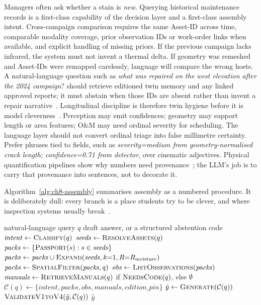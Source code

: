 Managers often ask whether a stain is \emph{new}. Querying historical maintenance records is a first-class capability of the decision layer and a first-class assembly intent. Cross-campaign comparison requires the same Asset-ID across time, comparable modality coverage, prior observation IDs or work-order links when available, and explicit handling of missing priors. If the previous campaign lacks infrared, the system must not invent a thermal delta. If geometry was remeshed and Asset-IDs were remapped carelessly, language will compare the wrong hosts. A natural-language question such as \emph{what was repaired on the west elevation after the 2024 campaign}? should retrieve editioned twin memory and any linked approved reports; it must abstain when those IDs are absent rather than invent a repair narrative~\cite{zhang2025,yang2025detreconreg,chen2023facility}. Longitudinal discipline is therefore twin hygiene before it is model cleverness~\cite{zhang2025,yang2025detreconreg,zhao2026physical}. Perception may emit confidences; geometry may support length or area features; O\&M may need ordinal severity for scheduling. The language layer should not convert ordinal triage into false millimetre certainty. Prefer phrases tied to fields, such as \emph{severity=medium from geometry-normalised crack length; confidence=0.71 from detector}, over cinematic adjectives. Physical quantification pipelines show why numbers need provenance~\cite{zhao2024facade,zhao2026physical}; the LLM's job is to carry that provenance into sentences, not to decorate it.

Algorithm~\ref{alg:ch8-assembly} summarises assembly as a numbered procedure. It is deliberately dull: every branch is a place students try to be clever, and where inspection systems usually break~\cite{lewis2020,peng2024,jeon2025hybridrag}.

\begin{algorithm}[htbp]
\caption{Intent-conditioned twin assembly for a grounded inspection answer.}
\label{alg:ch8-assembly}
\begin{algorithmic}[1]
\Require natural-language query $q$
\Ensure draft answer, or a structured abstention code
\State $\mathit{intent} \gets \textsc{Classify}(q)$
\State $\mathit{seeds} \gets \textsc{ResolveAssets}(q)$ 
\State $\mathit{packs} \gets \{\textsc{Passport}(s): s\in\mathit{seeds}\}$
 \State $\mathit{packs} \gets \mathit{packs}\cup\textsc{Expand}(\mathit{seeds},k{=}1,R{=}R_{\mathrm{moisture}})$
\EndIf
{}
 \State $\mathit{packs} \gets \textsc{SpatialFilter}(\mathit{packs},q)$
\EndIf
\State $\mathit{obs} \gets \textsc{ListObservations}(\mathit{packs})$
\State $\mathit{manuals} \gets \textsc{RetrieveManuals}(q)$ if $\textsc{NeedsCode}(q)$, else $\emptyset$
\State $\mathcal{C}(q) \gets \{\mathit{intent},\mathit{packs},\mathit{obs},\mathit{manuals},\mathit{edition\_pin}\}$
\State $\hat{y} \gets \textsc{Generate}(\mathcal{C}(q))$
\State $\textsc{ValidateV1toV4}(\hat{y},\mathcal{C}(q))$ 
\State \Return $\hat{y}$
\end{algorithmic}
\end{algorithm}

